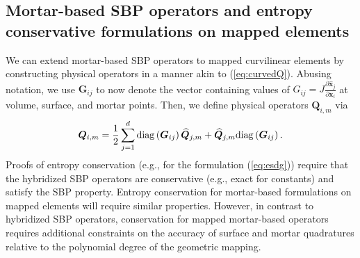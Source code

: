 \documentclass{svjour3}                     %
\renewcommand{\hat}{\widehat}
\renewcommand{\tilde}{\widetilde}
\newcommand{\diag}[1]{{\rm diag}\LRp{#1}}
\newcommand{\td}[2]{\frac{{\rm d}#1}{{\rm d}{\rm #2}}}
\newcommand{\pd}[2]{\frac{\partial#1}{\partial#2}}
\newcommand{\LRp}[1]{\left( #1 \right)}
\renewcommand{\note}[1]{{\color{blue}{#1}}}
\begin{document}
%


\subsection{Mortar-based SBP operators and entropy conservative formulations on mapped elements}

We can extend mortar-based SBP operators to mapped curvilinear elements by constructing physical operators in a manner akin to (\ref{eq:curvedQ}).  Abusing notation, we use $\bm{G}_{ij}$ to now denote the vector containing values of $G_{ij} = J\pd{\hat{\bm{x}}_j}{\bm{x}_i}$ at volume, surface, and mortar points.  Then, we define physical operators $\bm{Q}_{i,m}$ via
\begin{equation}
\bm{Q}_{i,m} = \frac{1}{2}\sum_{j=1}^d \diag{\bm{G}_{ij}}\hat{\bm{Q}}_{j,m} + \hat{\bm{Q}}_{j,m} \diag{\bm{G}_{ij}}.
\label{eq:curvedQ_mortar}
\end{equation}
Proofs of entropy conservation (e.g., for the formulation (\ref{eq:esdg})) require that the hybridized SBP operators are conservative (e.g., exact for constants) and satisfy the SBP property.  Entropy conservation for mortar-based formulations on mapped elements will require similar properties.  However, in contrast to hybridized SBP operators, conservation for mapped mortar-based operators requires additional constraints on the accuracy of surface and mortar quadratures relative to the polynomial degree of the geometric mapping.  
\end{document}
